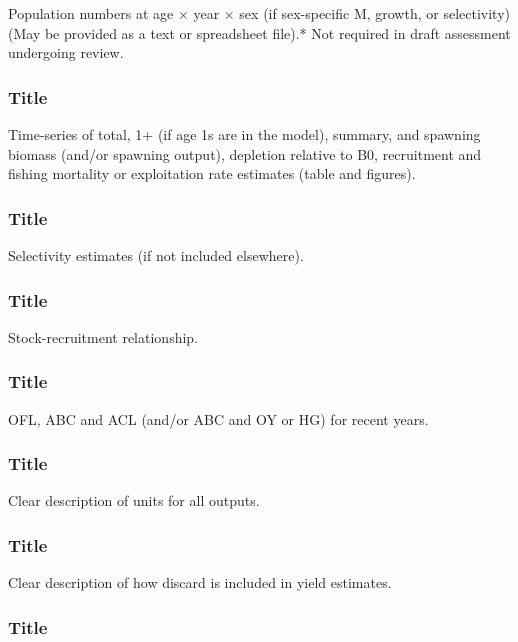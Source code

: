 \documentclass[12pt,]{article}
\begin{document}
Population numbers at age × year × sex (if sex-specific M, growth, or
selectivity) (May be provided as a text or spreadsheet file).* Not
required in draft assessment undergoing review.

\subsubsection{Title}\label{title-26}

Time-series of total, 1+ (if age 1s are in the model), summary, and
spawning biomass (and/or spawning output), depletion relative to B0,
recruitment and fishing mortality or exploitation rate estimates (table
and figures).

\subsubsection{Title}\label{title-27}

Selectivity estimates (if not included elsewhere).

\subsubsection{Title}\label{title-28}

Stock-recruitment relationship.

\subsubsection{Title}\label{title-29}

OFL, ABC and ACL (and/or ABC and OY or HG) for recent years.

\subsubsection{Title}\label{title-30}

Clear description of units for all outputs.

\subsubsection{Title}\label{title-31}

Clear description of how discard is included in yield estimates.

\subsubsection{Title}\label{title-32}
\end{document}
